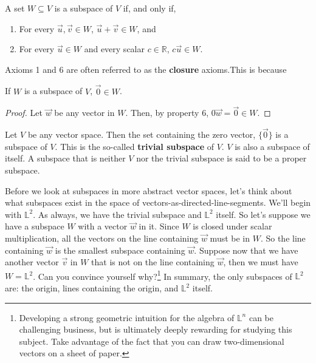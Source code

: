 \begin{theorem}
	A set $W \subseteq V$ is a subspace of $V$ if, and only if,
	\begin{enumerate}
		\item For every $\vec{u}, \vec{v} \in W$, $\vec{u} + \vec{v} \in W$, and
		\item For every $\vec{u} \in W$ and every scalar $c \in \mathbb{R}$, $c\vec{u} \in W$.
	\end{enumerate}
\end{theorem}

\begin{remark}
	Axioms 1 and 6 are often referred to as the \textbf{closure} axioms.This is because 
\end{remark}

\begin{corollary}
	If $W$ is a subspace of $V$, $\vec{0} \in W$.
\end{corollary}

\begin{proof}
	Let $\vec{w}$ be any vector in $W$. Then, by property 6, $0\vec{w} = \vec{0} \in W$.
\end{proof}

\begin{example}
	Let $V$ be any vector space. Then the set containing the zero vector, $\{\vec{0}\}$ is a subspace of $V$. This is the so-called \textbf{trivial subspace} of $V$. $V$ is also a subspace of itself. A subspace that is neither $V$ nor the trivial subspace is said to be a proper subspace.
\end{example}

Before we look at subspaces in more abstract vector spaces, let's think about what subspaces exist in the space of vectors-as-directed-line-segments. We'll begin with $\mathbb{L}^2$. As always, we have the trivial subspace and $\mathbb{L}^2$ itself. So let's suppose we have a subspace $W$ with a vector $\vec{w}$ in it. Since $W$ is closed under scalar multiplication, all the vectors on the line containing $\vec{w}$ must be in $W$. So the line containing $\vec{w}$ is the smallest subspace containing $\vec{w}$. Suppose now that we have another vector $\vec{v}$ in $W$ that is not on the line containing $\vec{w}$, then we must have $W = \mathbb{L}^2$. Can you convince yourself why?\footnote{Developing a strong geometric intuition for the algebra of $\mathbb{L}^n$ can be challenging business, but is ultimately deeply rewarding for studying this subject. Take advantage of the fact that you can draw two-dimensional vectors on a sheet of paper.} In summary, the only subspaces of $\mathbb{L}^2$ are: the origin, lines containing the origin, and $\mathbb{L}^2$ itself.

